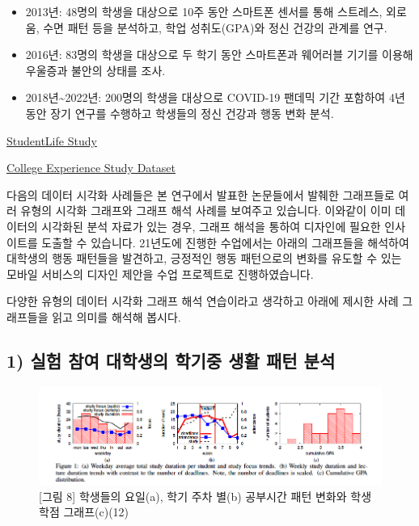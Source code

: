 \documentclass[
  letterpaper,
]{book}
\providecommand{\tightlist}{%
  \setlength{\itemsep}{0pt}\setlength{\parskip}{0pt}}\usepackage{longtable,booktabs,array}
\begin{document}
\begin{itemize}
\tightlist
\item
  2013년: 48명의 학생을 대상으로 10주 동안 스마트폰 센서를 통해
  스트레스, 외로움, 수면 패턴 등을 분석하고, 학업 성취도(GPA)와 정신
  건강의 관계를 연구.
\item
  2016년: 83명의 학생을 대상으로 두 학기 동안 스마트폰과 웨어러블 기기를
  이용해 우울증과 불안의 상태를 조사.
\item
  2018년\textasciitilde2022년: 200명의 학생을 대상으로 COVID-19 팬데믹
  기간 포함하여 4년 동안 장기 연구를 수행하고 학생들의 정신 건강과 행동
  변화 분석.
\end{itemize}

\href{https://studentlife.cs.dartmouth.edu}{StudentLife Study}

\href{https://www.kaggle.com/datasets/subigyanepal/college-experience-dataset?resource=download}{College
Experience Study Dataset}

다음의 데이터 시각화 사례들은 본 연구에서 발표한 논문들에서 발췌한
그래프들로 여러 유형의 시각화 그래프와 그래프 해석 사례를 보여주고
있습니다. 이와같이 이미 데이터의 시각화된 분석 자료가 있는 경우, 그래프
해석을 통하여 디자인에 필요한 인사이트를 도출할 수 있습니다. 21년도에
진행한 수업에서는 아래의 그래프들을 해석하여 대학생의 행동 패턴들을
발견하고, 긍정적인 행동 패턴으로의 변화를 유도할 수 있는 모바일 서비스의
디자인 제안을 수업 프로젝트로 진행하였습니다.

다양한 유형의 데이터 시각화 그래프 해석 연습이라고 생각하고 아래에
제시한 사례 그래프들을 읽고 의미를 해석해 봅시다.

\subsection{1) 실험 참여 대학생의 학기중 생활 패턴
분석}\label{uxc2e4uxd5d8-uxcc38uxc5ec-uxb300uxd559uxc0dduxc758-uxd559uxae30uxc911-uxc0dduxd65c-uxd328uxd134-uxbd84uxc11d}

\begin{figure}[H]

{\centering \includegraphics{img/fig8.png}

}

\caption{{[}그림 8{]} 학생들의 요일(a), 학기 주차 별(b) 공부시간 패턴
변화와 학생 학점 그래프(c)(12)}

\end{figure}%
\end{document}
